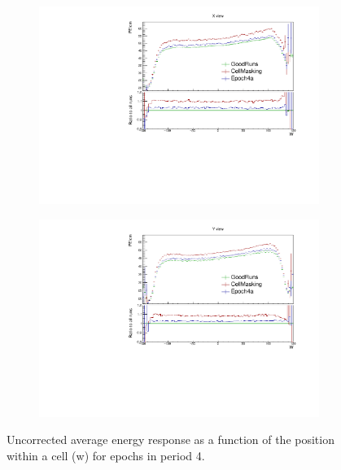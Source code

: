 \documentclass[12pt,a4paper]{article}
\begin{document}
\begin{figure}[!hbtp]
\centering
\begin{subfigure}[b]{0.495\textwidth}
\centering
\includegraphics[width=\textwidth]{Plots/Attenprofs_P4Data_WPE_corr_xy_X_Combined.pdf}
\end{subfigure}
\begin{subfigure}[b]{0.495\textwidth}
\centering
\includegraphics[width=\textwidth]{Plots/Attenprofs_P4Data_WPE_corr_xy_Y_Combined.pdf}
\end{subfigure}
\caption{Uncorrected average energy response as a function of the position within a cell (w) for epochs in period 4.}
\label{figCalibhistWPE_period4}
\end{figure}
\end{document}
